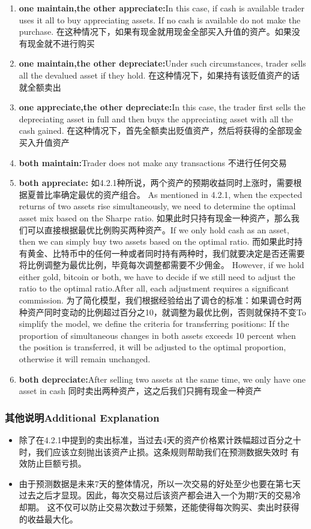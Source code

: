 \documentclass{mcmthesis}
\begin{document}
\begin{enumerate}
  \item \textbf{one maintain,the other appreciate:}In this case, if cash is available trader uses it all to buy appreciating assets. If no cash is available do not make the purchase.
  在这种情况下，如果有现金就用现金全部买入升值的资产。如果没有现金就不进行购买
  \item \textbf{one maintain,the other depreciate:}Under such circumstances, trader sells all the devalued asset if they hold.
  在这种情况下，如果持有该贬值资产的话就全额卖出
  \item \textbf{one appreciate,the other depreciate:}In this case, the trader first sells the depreciating asset in full and then buys the appreciating asset with all the cash gained.
  在这种情况下，首先全额卖出贬值资产，然后将获得的全部现金买入升值资产
  \item \textbf{both maintain:}Trader does not make any transactions
  不进行任何交易
    \item \textbf{both appreciate:}
  如4.2.1种所说，两个资产的预期收益同时上涨时，需要根据夏普比率确定最优的资产组合。
  As mentioned in 4.2.1, when the expected returns of two assets rise simultaneously, we need to determine the optimal asset mix based on the Sharpe ratio.
  如果此时只持有现金一种资产，那么我们可以直接根据最优比例购买两种资产。If we only hold cash as an asset, then we can simply buy two assets based on the optimal ratio.
  而如果此时持有黄金、比特币中的任何一种或者同时持有两种时，我们就要决定是否还需要将比例调整为最优比例，毕竟每次调整都需要不少佣金。
  However, if we hold either gold, bitcoin or both, we have to decide if we still need to adjust the ratio to the optimal ratio.After all, each adjustment requires a significant commission.
  为了简化模型，我们根据经验给出了调仓的标准：如果调仓时两种资产同时变动的比例超过百分之10，就调整为最优比例，否则就保持不变To simplify the model, we define the criteria for transferring positions:
  If the proportion of simultaneous changes in both assets exceeds 10 percent when the position is transferred, it will be adjusted to the optimal proportion, otherwise it will remain unchanged.
  
  \item\textbf{both depreciate:}After selling two assets at the same time, we only have one asset in cash
  同时卖出两种资产，这之后我们只拥有现金一种资产
\end{enumerate}

\subsubsection{其他说明Additional Explanation}
\begin{itemize}
  \item 除了在4.2.1中提到的卖出标准，当过去4天的资产价格累计跌幅超过百分之十时，我们应该立刻抛出该资产止损。这条规则帮助我们在预测数据失效时
  有效防止巨额亏损。
  \item 由于预测数据是未来7天的整体情况，所以一次交易的好处至少也要在第七天过去之后才显现。因此，每次交易过后该资产都会进入一个为期7天的交易冷却期。
  这不仅可以防止交易次数过于频繁，还能使得每次购买、卖出时获得的收益最大化。
\end{itemize}
\end{document}
